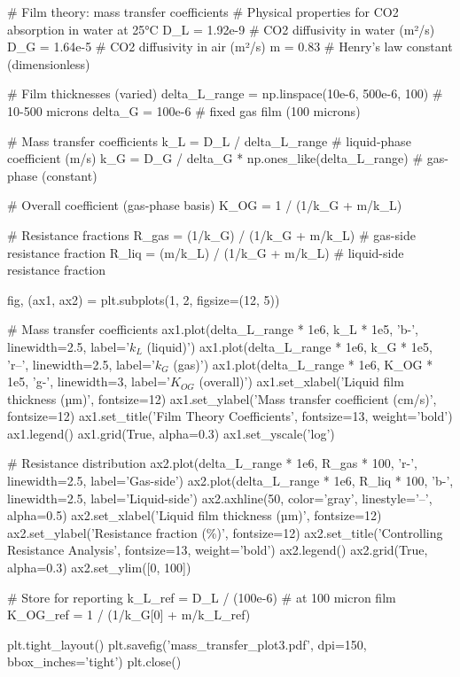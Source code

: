 \documentclass[11pt,a4paper]{article}
\begin{document}
\begin{pycode}
# Film theory: mass transfer coefficients
# Physical properties for CO2 absorption in water at 25°C
D_L = 1.92e-9  # CO2 diffusivity in water (m²/s)
D_G = 1.64e-5  # CO2 diffusivity in air (m²/s)
m = 0.83       # Henry's law constant (dimensionless)

# Film thicknesses (varied)
delta_L_range = np.linspace(10e-6, 500e-6, 100)  # 10-500 microns
delta_G = 100e-6  # fixed gas film (100 microns)

# Mass transfer coefficients
k_L = D_L / delta_L_range  # liquid-phase coefficient (m/s)
k_G = D_G / delta_G * np.ones_like(delta_L_range)  # gas-phase (constant)

# Overall coefficient (gas-phase basis)
K_OG = 1 / (1/k_G + m/k_L)

# Resistance fractions
R_gas = (1/k_G) / (1/k_G + m/k_L)  # gas-side resistance fraction
R_liq = (m/k_L) / (1/k_G + m/k_L)  # liquid-side resistance fraction

fig, (ax1, ax2) = plt.subplots(1, 2, figsize=(12, 5))

# Mass transfer coefficients
ax1.plot(delta_L_range * 1e6, k_L * 1e5, 'b-', linewidth=2.5, label='$k_L$ (liquid)')
ax1.plot(delta_L_range * 1e6, k_G * 1e5, 'r--', linewidth=2.5, label='$k_G$ (gas)')
ax1.plot(delta_L_range * 1e6, K_OG * 1e5, 'g-', linewidth=3, label='$K_{OG}$ (overall)')
ax1.set_xlabel('Liquid film thickness (µm)', fontsize=12)
ax1.set_ylabel('Mass transfer coefficient (cm/s)', fontsize=12)
ax1.set_title('Film Theory Coefficients', fontsize=13, weight='bold')
ax1.legend()
ax1.grid(True, alpha=0.3)
ax1.set_yscale('log')

# Resistance distribution
ax2.plot(delta_L_range * 1e6, R_gas * 100, 'r-', linewidth=2.5, label='Gas-side')
ax2.plot(delta_L_range * 1e6, R_liq * 100, 'b-', linewidth=2.5, label='Liquid-side')
ax2.axhline(50, color='gray', linestyle='--', alpha=0.5)
ax2.set_xlabel('Liquid film thickness (µm)', fontsize=12)
ax2.set_ylabel('Resistance fraction (\%)', fontsize=12)
ax2.set_title('Controlling Resistance Analysis', fontsize=13, weight='bold')
ax2.legend()
ax2.grid(True, alpha=0.3)
ax2.set_ylim([0, 100])

# Store for reporting
k_L_ref = D_L / (100e-6)  # at 100 micron film
K_OG_ref = 1 / (1/k_G[0] + m/k_L_ref)

plt.tight_layout()
plt.savefig('mass_transfer_plot3.pdf', dpi=150, bbox_inches='tight')
plt.close()
\end{pycode}
\end{document}
